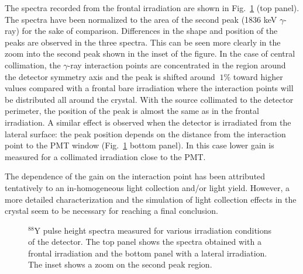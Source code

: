 \documentclass[review,number,sort&compress]{elsarticle}
\begin{document}
The spectra recorded from the frontal irradiation are shown in Fig.~\ref{lightcoll} (top panel). The spectra have been normalized to the area of the second peak (1836 keV $\gamma$-ray) for the sake of comparison. Differences in the shape and position of the peaks are observed in the three spectra. This can be seen more clearly in the zoom into the second peak shown in the inset of the figure. In the case of central collimation, the $\gamma$-ray interaction points are concentrated in the region around the detector symmetry axis and the peak is shifted around $~1\%$ toward higher values compared with a frontal bare irradiation where the interaction points will be distributed all around the crystal. With the source collimated to the detector perimeter, the position of the peak is almost the same as in the frontal irradiation. 
A similar effect is observed when the detector is irradiated from the lateral surface: the peak position depends on the distance from the interaction point to the PMT window (Fig.~\ref{lightcoll} bottom panel). In this case lower gain is measured for a collimated irradiation close to the PMT.

The dependence of the gain on the interaction point has been attributed tentatively to an in-homogeneous light collection and/or light yield. However, a more detailed characterization and the simulation of light collection effects in the crystal seem to be necessary for reaching a final conclusion.

\begin{figure}[h!]
\centering
{}\label{frontal}
\label{lateral}
\caption{$^{88}$Y pulse height spectra measured for various irradiation conditions of the detector. The top panel shows the spectra obtained with a frontal irradiation and the bottom panel with a lateral irradiation. The inset shows a zoom on the second peak region.}
\label{lightcoll}
\end{figure}
\end{document}
